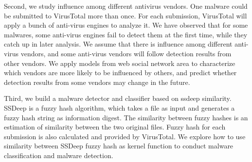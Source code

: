 Second, we study influence among different antivirus vendors. 
One malware could be submitted to VirusTotal more than once. 
For each submission, VirusTotal will apply a bunch of anti-virus engines to analyze it.
We have observed that for some malwares, some anti-virus engines fail to detect them at the first time, while they catch up in later analysis. 
We assume that there is influence among different anti-virus vendors, 
and some anti-virus vendors will follow detection results from other vendors. 
We apply models from web social network area to characterize 
which vendors are more likely to be influenced by others, 
and predict whether detection results from some vendors may change in the future.  

Third, we build a malware detector and classifier based on ssdeep similarity. 
SSDeep is a fuzzy hash algorithm, which takes a file as input and generates a fuzzy hash string as information digest. 
The similarity between fuzzy hashes is an estimation of similarity between the two original files. 
Fuzzy hash for each submission is also calculated and provided by VirusTotal. 
We explore how to use similarity between SSDeep fuzzy hash as 
kernel function to conduct malware classification and malware detection. 